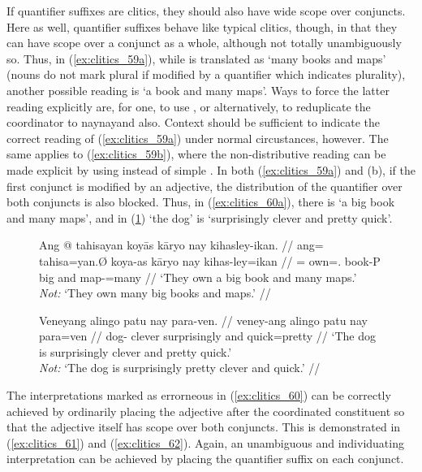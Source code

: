 If quantifier suffixes are clitics, they should also have wide scope over
conjuncts. Here as well, quantifier suffixes behave like typical clitics,
though, in that they can have scope over a conjunct as a whole, although not
totally unambiguously so. Thus, in (\ref{ex:clitics_59a}), while  is translated as `many books and
maps' (nouns do not mark plural if modified by a quantifier which indicates
plurality), another possible reading is `a book and many maps'. Ways to force
the latter reading explicitly are, for one, to use , or alternatively, to reduplicate the coordinator
 to  {naynay}{and also}. Context should be
sufficient to indicate the correct reading of (\ref{ex:clitics_59a}) under
normal circustances, however. The same applies to (\ref{ex:clitics_59b}), where
the non-distributive reading can be made explicit by using 
instead of simple . In both (\ref{ex:clitics_59a}) and (b), if
the first conjunct is modified by an adjective, the distribution of the
quantifier over both conjuncts is also blocked. Thus, in
(\ref{ex:clitics_60a}), there is `a big book and many maps', and in
(\ref{ex:clitics_60b}) `the dog' is `surprisingly clever and pretty quick'.

\begin{figure}[h]
\pex\label{ex:clitics_60}
\a\label{ex:clitics_60a}\begingl
	\gla Ang @ tahisayan koyās kāryo nay kihasley-ikan. //
	\glb ang= tahisa=yan.Ø koya-as kāryo nay kihas-ley=ikan //
	\glc \AgtT{}= own=\TplM{}.\Top{} book-P big and map-\PargI{}=many //
	\glft `They own a big book and many maps.' \\
		\textit{Not:} `They own many big books and maps.' //
\endgl

\a\label{ex:clitics_60b}\begingl
	\gla Veneyang alingo patu nay para-ven. //
	\glb veney-ang alingo patu nay para=ven //
	\glc dog-\Aarg{} clever surprisingly and quick=pretty //
	\glft `The dog is surprisingly clever and pretty quick.' \\
		\textit{Not:} `The dog is surprisingly pretty clever and quick.' //
\endgl
\xe
\end{figure}

The interpretations marked as errorneous in (\ref{ex:clitics_60}) can be
correctly achieved by ordinarily placing the adjective after the coordinated
constituent so that the adjective itself has scope over both conjuncts. This is
demonstrated in (\ref{ex:clitics_61}) and (\ref{ex:clitics_62}). Again, an
unambiguous and individuating interpretation can be achieved by placing the
quantifier suffix on each conjunct.


